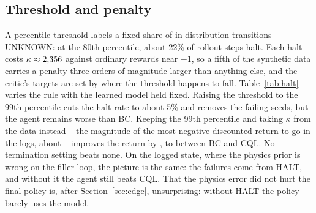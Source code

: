 \documentclass[11pt]{article}
\begin{document}
\begin{table}[h]
\centering\small
{}
\caption{Factorial ablation on the Markov state, seeds 0--9. ``Paired vs CQL'' is the per-seed return difference against CQL trained on the same dataset. In cells with a failing seed the interval is on the IQM, and $\dagger$ marks a difference of IQMs with a paired bootstrap interval (Section~3).}
\label{tab:factorial}
\end{table}

\subsection{Threshold and penalty}\label{sec:halt}

A percentile threshold labels a fixed share of in-distribution transitions UNKNOWN: at the 80th percentile, about 22\% of rollout steps halt. Each halt costs $\kappa\approx2{,}356$ against ordinary rewards near $-1$, so a fifth of the synthetic data carries a penalty three orders of magnitude larger than anything else, and the critic's targets are set by where the threshold happens to fall. Table~\ref{tab:halt} varies the rule with the learned model held fixed. Raising the threshold to the 99th percentile cuts the halt rate to about 5\% and removes the failing seeds, but the agent remains worse than BC. Keeping the 99th percentile and taking $\kappa$ from the data instead -- the magnitude of the most negative discounted return-to-go in the logs, about \kappadata{} -- improves the return by , to between BC and CQL. No termination setting beats none. On the logged state, where the physics prior is wrong on the filler loop, the picture is the same: the failures come from HALT, and without it the agent still beats CQL. That the physics error did not hurt the final policy is, after Section~\ref{sec:edge}, unsurprising: without HALT the policy barely uses the model.

\begin{table}[h]
\centering\scriptsize
\setlength{\tabcolsep}{3pt}
\caption{Termination rule with the learned hybrid model fixed, seeds 0--9. ``Halted'' is the mean share of rollout steps that reach HALT. The data-derived $\kappa$ was run on the Markov state only. Intervals as in Table~\ref{tab:factorial}.}
\label{tab:halt}
\end{table}
\end{document}
